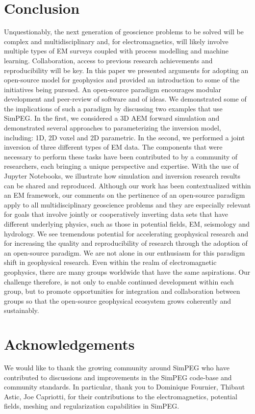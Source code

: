 \documentclass[paper]{geophysics}
\begin{document}
\section{Conclusion}

Unquestionably, the next generation of geoscience problems to be solved will be complex and multidisciplinary and, for electromagnetics, will likely involve multiple types of EM surveys coupled with process modelling and machine learning. Collaboration, access to previous research achievements and reproducibility will be key. In this paper we presented arguments for adopting an open-source model for geophysics and provided an introduction to some of the initiatives being pursued. An open-source paradigm encourages modular development and peer-review of software and of ideas. We demonstrated some of the implications of such a paradigm by discussing two examples that use SimPEG. In the first, we considered a 3D AEM forward simulation and demonstrated several approaches to parameterizing the inversion model, including: 1D, 2D voxel and 2D parametric. In the second, we performed a joint inversion of three different types of EM data. The components that were necessary to perform these tasks have been contributed to by a community of researchers, each bringing a unique perspective and expertise. With the use of Jupyter Notebooks, we illustrate how simulation and inversion research results can be shared and reproduced. Although our work has been contextualized within an EM framework, our comments on the pertinence of an open-source paradigm apply to all multidisciplinary geoscience problems and they are especially relevant for goals that involve jointly or cooperatively inverting data sets that have different underlying physics, such as those in potential fields, EM, seismology and hydrology. We see tremendous potential for accelerating geophysical research and for increasing the quality and reproducibility of research through the adoption of an open-source paradigm. We are not alone in our enthusiasm for this paradigm shift in geophysical research. Even within the realm of electromagnetic geophysics, there are many groups worldwide that have the same aspirations. Our challenge therefore, is not only to enable continued development within each group, but to promote opportunities for integration and collaboration between groups so that the open-source geophysical ecosystem grows coherently and sustainably.


\section{Acknowledgements}
We would like to thank the growing community around SimPEG who have contributed to discussions and improvements in the SimPEG code-base and community standards. In particular, thank you to Dominique Fournier, Thibaut Astic, Joe Capriotti, for their contributions to the electromagnetics, potential fields, meshing and regularization capabilities in SimPEG.





\end{document}
